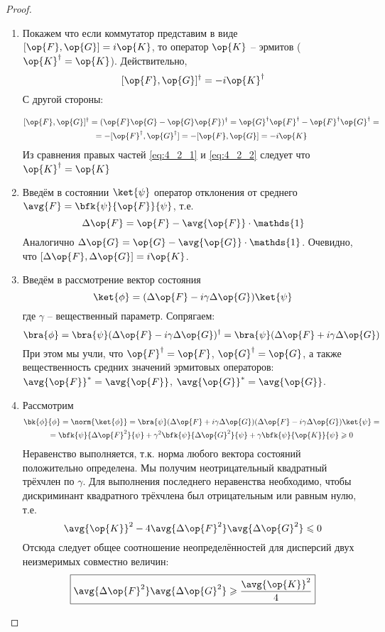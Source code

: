 \begin{proof}
\begin{enumerate}
\item Покажем что если коммутатор представим в виде $[\op{F},\op{G}]=i\op{K}$, то оператор $\op{K}$ -- эрмитов ($\op{K}^\dag=\op{K}$). Действительно,
\begin{equation}
  \label{eq:4_2_1}
  [\op{F},\op{G}]^\dag=-i\op{K}^\dag
\end{equation}%
%
С другой стороны:

\begin{equation}
\begin{gathered}
  \label{eq:4_2_2}
  [\op{F},\op{G}]^\dag= (\op{F}\op{G} - \op{G}\op{F})^\dag =
    \op{G}^\dag \op{F}^\dag - \op{F}^\dag \op{G}^\dag = \\ =
    -[\op{F}^\dag,\op{G}^\dag]= -[\op{F},\op{G}]= -i\op{K}
\end{gathered}
\end{equation}%
%
Из сравнения правых частей \eqref{eq:4_2_1} и \eqref{eq:4_2_2} следует что $\op{K}^\dag=\op{K}$

\item Введём в состоянии $\ket{\psi}$ оператор отклонения от среднего $\avg{F}=\bfk{\psi}{\op{F}}{\psi}$, т.е.
%
$$
  \Delta\op{F}=\op{F}-\avg{\op{F}}\cdot\mathds{1}
$$%
%
Аналогично $\Delta\op{G} = \op{G} - \avg{\op{G}} \cdot \mathds{1}$. Очевидно, что $[\Delta\op{F}, \Delta\op{G}] = i\op{K}$.

\item Введём в рассмотрение вектор состояния
$$
  \ket{\phi}=(\Delta\op{F}-i\gamma\Delta\op{G})\ket{\psi}
$$%
%
где $\gamma$ -- вещественный параметр. Сопрягаем:
$$
  \bra{\phi} = \bra{\psi} (\Delta\op{F} - i\gamma\Delta\op{G})^\dag =
    \bra{\psi} (\Delta\op{F} + i\gamma\Delta\op{G})
$$%
%
При этом мы учли, что $\op{F}^\dag = \op{F}$, $\op{G}^\dag = \op{G}$, а также вещественность средних значений эрмитовых операторов: $\avg{\op{F}}^* = \avg{\op{F}}$, $\avg{\op{G}}^* = \avg{\op{G}}$.

\item Рассмотрим
$$
\begin{gathered}
  \bk{\phi}{\phi} = \norm{\ket{\phi}} =
    \bra{\psi}(\Delta\op{F} + i\gamma\Delta\op{G})
        (\Delta\op{F} - i\gamma\Delta\op{G})\ket{\psi} = \\ =
    \bfk{\psi}{\Delta\op{F}^2}{\psi} + \gamma^2\bfk{\psi}{\Delta\op{G}^2}{\psi} +
      \gamma\bfk{\psi}{\op{K}}{\psi} \geqslant 0
\end{gathered}
$$%
%
Неравенство выполняется, т.к. норма любого вектора состояний положительно определена. Мы получим неотрицательный квадратный трёхчлен по $\gamma$. Для выполнения последнего неравенства необходимо, чтобы дискриминант квадратного трёхчлена был отрицательным или равным нулю, т.е.
$$
  \avg{\op{K}}^2 - 4 \avg{\Delta\op{F}^2} \avg{\Delta\op{G}^2} \leqslant 0
$$%
%
Отсюда следует общее соотношение неопределённостей для дисперсий двух неизмеримых совместно величин:
$$
  \boxed{
    \avg{\Delta\op{F}^2} \avg{\Delta\op{G}^2} \geqslant \frac{\avg{\op{K}}^2}{4}
  }
$$


\end{enumerate}
\end{proof}
